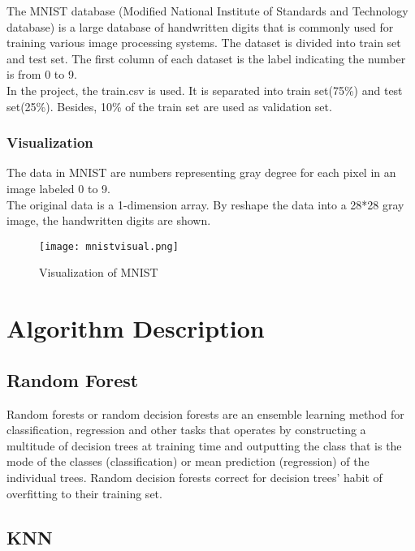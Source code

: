 \documentclass{article}
\begin{document}
The MNIST database (Modified National Institute of Standards and Technology database) is a large database of handwritten digits that is commonly used for training various image processing systems. The dataset is divided into train set and test set. The first column of each dataset is the label indicating the number is from 0 to 9.\\
In the project, the train.csv is used. It is separated into train set(75\%) and test set(25\%). Besides, 10\% of the train set are used as validation set.

\subsubsection{Visualization}
The data in MNIST are numbers representing gray degree for each pixel in an image labeled 0 to 9.\\
The original data is a 1-dimension array. By reshape the data into a 28*28 gray image, the handwritten digits are shown.\\
\begin{figure}[H]
\centering

\texttt{[image: mnistvisual.png]}
\caption{Visualization of MNIST}
\label{fig2.1}

\end{figure}



\section{Algorithm Description}
\subsection{Random Forest}
Random forests or random decision forests are an ensemble learning method for classification, regression and other tasks that operates by constructing a multitude of decision trees at training time and outputting the class that is the mode of the classes (classification) or mean prediction (regression) of the individual trees. Random decision forests correct for decision trees' habit of overfitting to their training set.



\subsection{KNN}
\end{document}
